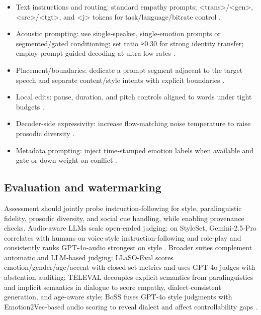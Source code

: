 \begin{itemize}
\item Text instructions and routing: standard empathy prompts; <trans>/<gen>, <src>/<tgt>, and <j> tokens for task/language/bitrate control \cite{wang2024blspemotowardsempatheticlargespeechlangu,peng2024mslms2stmultitaskspeechlanguagemodeltext}.
\item Acoustic prompting: use single‑speaker, single‑emotion prompts or segmented/gated conditioning; set ratio ≈0.30 for strong identity transfer; employ prompt‑guided decoding at ultra‑low rates \cite{peng2024empiricalstudyspeechlanguagemodelsprompt,gong2024seamlessexpressivelmspeechlanguagemodele,wang2025tadicodectextawarediffusionspeechtokeniz}.
\item Placement/boundaries: dedicate a prompt segment adjacent to the target speech and separate content/style intents with explicit boundaries \cite{wu2024speechcomposerunifyingmultiplespeechtask}.
\item Local edits: pause, duration, and pitch controls aligned to words under tight budgets \cite{huang2023holisticcascadesystembenchmarkhumanevalu}.
\item Decoder‑side expressivity: increase flow‑matching noise temperature to raise prosodic diversity \cite{yuan2024continuousspeechtokensmakesllmsrobustmul}.
\item Metadata prompting: inject time‑stamped emotion labels when available and gate or down‑weight on conflict \cite{wang2025incorporatingcontextualparalinguisticund}.
\end{itemize}

\subsection{Evaluation and watermarking} \label{subsec:Evaluation and watermarking}
Assessment should jointly probe instruction‑following for style, paralinguistic fidelity, prosodic diversity, and social cue handling, while enabling provenance checks. Audio‑aware LLMs scale open‑ended judging: on StyleSet, Gemini‑2.5‑Pro correlates with humans on voice‑style instruction‑following and role‑play and consistently ranks GPT‑4o‑audio strongest on style \cite{chiang2025audioawarelargelanguagemodelsasjudgesspe}. Broader suites complement automatic and LLM‑based judging: LLaSO‑Eval scores emotion/gender/age/accent with closed‑set metrics and uses GPT‑4o judges with abstention auditing; TELEVAL decouples explicit semantics from paralinguistics and implicit semantics in dialogue to score empathy, dialect‑consistent generation, and age‑aware style; BoSS fuses GPT‑4o style judgments with Emotion2Vec‑based audio scoring to reveal dialect and affect controllability gaps \cite{sun2025llasofoundationalframeworkreproduciblere,li2025televaldynamicbenchmarkdesignedspokenlan,wang2025bossbeyondsemanticspeech}. 

